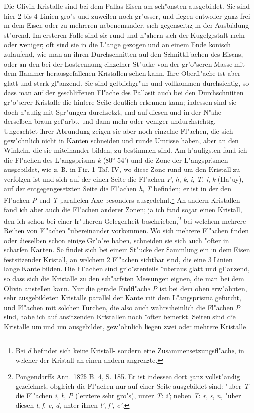\documentclass[a4paper, 11pt, oneside]{article}
\begin{document}
Die Olivin-Kristalle sind bei dem Pallas-Eisen am sch"onsten ausgebildet. Sie sind hier 2 bis 4 Linien gro"s und zuweilen noch gr"osser, und liegen entweder ganz frei in dem Eisen oder zu mehreren nebeneinander, sich gegenseitig in der Ausbildung st"orend. Im ersteren Falle sind sie rund und n"ahern sich der Kugelgestalt mehr oder weniger; oft sind sie in die L"ange gezogen und an einem Ende konisch zulaufend, wie man an ihren Durchschnitten auf den Schnittfl"achen des Eisens, oder an den bei der Lostrennung einzelner St"ucke von der gr"o"seren Masse mit dem Hammer herausgefallenen Kristallen sehen kann. Ihre Oberfl"ache ist aber glatt und stark gl"anzend. Sie sind gelblichgr"un und vollkommen durchsichtig, so dass man auf der geschliffenen Fl"ache des Pallasit auch bei den Durchschnitten gr"o"serer Kristalle die hintere Seite deutlich erkennen kann; indessen sind sie doch h"aufig mit Spr"ungen durchsetzt, und auf diesen und in der N"ahe derselben braun gef"arbt, und dann mehr oder weniger undurchsichtig. Ungeachtet ihrer Abrundung zeigen sie aber noch einzelne Fl"achen, die sich gew"ohnlich nicht in Kanten schneiden und runde Umrisse haben, aber an den Winkeln, die sie miteinander bilden, zu bestimmen sind. Am h"aufigsten fand ich die Fl"achen des L"angsprisma \emph{k} (80° 54’) und die Zone der L"angsprismen ausgebildet, wie z. B. in Fig. 1 Taf. IV, wo diese Zone rund um den Kristall zu verfolgen ist und sich auf der einen Seite die Fl"achen \emph{P}, \emph{h}, \emph{k}, \emph{i}, \emph{T}, \emph{i}, \emph{k} (Ha"uy), auf der entgegengesetzten Seite die Fl"achen \emph{h}, \emph{T} befinden; er ist in der den Fl"achen \emph{P} und \emph{T} parallelen Axe besonders ausgedehnt.\footnote{Bei \emph{d} befindet sich keine Kristall- sondern eine Zusammensetzungsfl"ache, in welcher der Kristall an einen andern angrenzte.} An andern Kristallen fand ich aber auch die Fl"achen anderer Zonen; ja ich fand sogar einen Kristall, den ich schon bei einer fr"uheren Gelegenheit beschrieben,\footnote{Pongendorffs Ann. 1825 B. 4, S. 185. Er ist indessen dort ganz vollst"andig gezeichnet, obgleich die Fl"achen nur auf einer Seite ausgebildet sind; "uber \emph{T} die Fl"achen \emph{i}, \emph{k}, \emph{P} (letztere sehr gro"s), unter \emph{T}: \emph{i'}; neben \emph{T}: \emph{r}, \emph{s}, \emph{n}, "uber diesen \emph{l}, \emph{f}, \emph{e}, \emph{d}, unter ihnen \emph{l'}, \emph{f'}, \emph{e'}.} bei welchem mehrere Reihen von Fl"achen "ubereinander vorkommen. Wo sich mehrere Fl"achen finden oder dieselben schon einige Gr"o"se haben, schneiden sie sich auch "ofter in scharfen Kanten. So findet sich bei einem St"ucke der Sammlung ein in dem Eisen festsitzender Kristall, an welchem 2 Fl"achen sichtbar sind, die eine 3 Linien lange Kante bilden. Die Fl"achen sind gr"o"stenteils "uberaus glatt und gl"anzend, so dass sich die Kristalle zu den sch"arfsten Messungen eignen, die man bei dem Olivin anstellen kann. Nur die gerade Endfl"ache \emph{P} ist bei dem oben erw"ahnten, sehr ausgebildeten Kristalle parallel der Kante mit dem L"angsprisma gefurcht, und Fl"achen mit solchen Furchen, die also auch wahrscheinlich die Fl"achen \emph{P} sind, habe ich auf ansitzenden Kristallen noch "ofter bemerkt. Seiten sind die Kristalle um und um ausgebildet, gew"ohnlich liegen zwei oder mehrere Kristalle 
\end{document}
